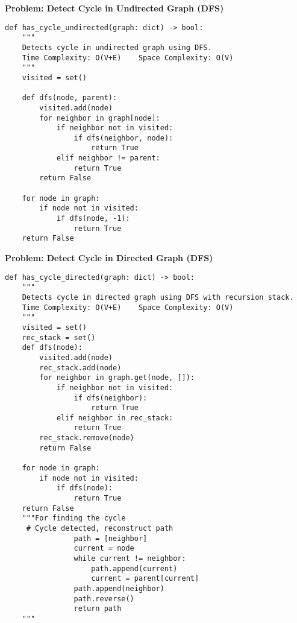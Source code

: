 \noindent\textbf{Problem: Detect Cycle in Undirected Graph (DFS)}
\begin{verbatim}
def has_cycle_undirected(graph: dict) -> bool:
    """
    Detects cycle in undirected graph using DFS.
    Time Complexity: O(V+E)    Space Complexity: O(V)
    """
    visited = set()
    
    def dfs(node, parent):
        visited.add(node)
        for neighbor in graph[node]:
            if neighbor not in visited:
                if dfs(neighbor, node):
                    return True
            elif neighbor != parent:
                return True
        return False
    
    for node in graph:
        if node not in visited:
            if dfs(node, -1):
                return True
    return False
\end{verbatim}

\noindent\textbf{Problem: Detect Cycle in Directed Graph (DFS)}
\begin{verbatim}
def has_cycle_directed(graph: dict) -> bool:
    """
    Detects cycle in directed graph using DFS with recursion stack.
    Time Complexity: O(V+E)    Space Complexity: O(V)
    """
    visited = set()
    rec_stack = set()    
    def dfs(node):
        visited.add(node)
        rec_stack.add(node)
        for neighbor in graph.get(node, []):
            if neighbor not in visited:
                if dfs(neighbor):
                    return True
            elif neighbor in rec_stack:
                return True
        rec_stack.remove(node)
        return False
    
    for node in graph:
        if node not in visited:
            if dfs(node):
                return True
    return False
    """For finding the cycle 
     # Cycle detected, reconstruct path
                path = [neighbor]
                current = node
                while current != neighbor:
                    path.append(current)
                    current = parent[current]
                path.append(neighbor)
                path.reverse()
                return path
    """
\end{verbatim}

